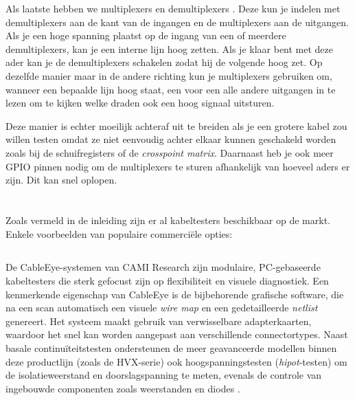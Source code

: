 Als laatste hebben we multiplexers en demultiplexers \autocite{NationalInstruments2022}. Deze kun je indelen met demultiplexers aan de kant van de ingangen en de multiplexers aan de uitgangen. Als je een hoge spanning plaatst op de ingang van een of meerdere demultiplexers, kan je een interne lijn hoog zetten. Als je klaar bent met deze ader kan je de demultiplexers schakelen zodat hij de volgende hoog zet. Op dezelfde manier maar in de andere richting kun je multiplexers gebruiken om, wanneer een bepaalde lijn hoog staat, een voor een alle andere uitgangen in te lezen om te kijken welke draden ook een hoog signaal uitsturen.

Deze manier is echter moeilijk achteraf uit te breiden als je een grotere kabel zou willen testen omdat ze niet eenvoudig achter elkaar kunnen geschakeld worden zoals bij de schuifregisters of de \textit{crosspoint matrix}. Daarnaast heb je ook meer \gls{GPIO} pinnen nodig om de multiplexers te sturen afhankelijk van hoeveel aders er zijn. Dit kan snel oplopen.

\section{} 
\label{sec:bestaandekabeltesters}

Zoals vermeld in de inleiding zijn er al kabeltesters beschikbaar op de markt. Enkele voorbeelden van populaire commerciële opties:

\subsection{} 
\label{ssec:CableEye}

De CableEye-systemen van CAMI Research zijn modulaire, PC-gebaseerde kabeltesters die sterk gefocust zijn op flexibiliteit en visuele diagnostiek. Een kenmerkende eigenschap van CableEye is de bijbehorende grafische software, die na een scan automatisch een visuele \textit{wire map} en een gedetailleerde \textit{netlist} genereert. Het systeem maakt gebruik van verwisselbare adapterkaarten, waardoor het snel kan worden aangepast aan verschillende connectortypes. Naast basale continuïteitstesten ondersteunen de meer geavanceerde modellen binnen deze productlijn (zoals de HVX-serie) ook hoogspanningstesten (\textit{hipot}-testen) om de isolatieweerstand en doorslagspanning te meten, evenals de controle van ingebouwde componenten zoals weerstanden en diodes \autocite{CAMI2024}.

